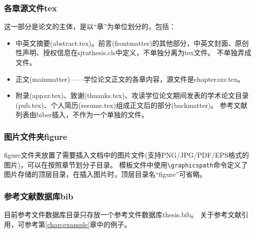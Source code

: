 \subsubsection{各章源文件tex}
\label{sec:thesisbody}

这一部分是论文的主体，是以“章”为单位划分的，包括：

\begin{itemize}[noitemsep,topsep=0pt,parsep=0pt,partopsep=0pt]
	\item 中英文摘要(abstract.tex)。前言(frontmatter)的其他部分，中英文封面、原创性声明、授权信息在sjtuthesis.cls中定义，不单独分离为tex文件。
不单独弄成文件。
	\item 正文(mainmatter)——学位论文正文的各章内容，源文件是chapter\emph{xxx}.tex。
	\item 附录(app\emph{xx}.tex)、致谢(thuanks.tex)、攻读学位论文期间发表的学术论文目录(pub.tex)、个人简历(resume.tex)组成正文后的部分(backmatter)。
参考文献列表由biber插入，不作为一个单独的文件。
\end{itemize}

\subsubsection{图片文件夹figure}
\label{sec:fig}

figure文件夹放置了需要插入文档中的图片文件(支持PNG/JPG/PDF/EPS格式的图片)，可以在按照章节划分子目录。
模板文件中使用\verb|\graphicspath|命令定义了图片存储的顶层目录，在插入图片时，顶层目录名“figure”可省略。

\subsubsection{参考文献数据库bib}
\label{sec:bib}

目前参考文件数据库目录只存放一个参考文件数据库thesis.bib。
关于参考文献引用，可参考第\ref{chap:example}章中的例子。

